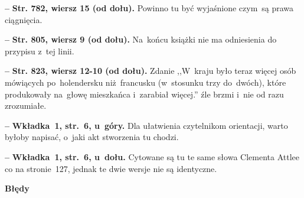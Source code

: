 \documentclass[a4paper,11pt]{article}
\newcommand{\spaceFour}{0.5em}
\newcommand{\tb}{\textbf}
\newcommand{\noi}{\noindent}
\newcommand{\start}{\noi \tb{--} {}}
\newcommand{\Center}[1]{\begin{center} #1 \end{center}}
\newcommand{\CenterTB}[1]{\Center{\tb{#1}}}
\newcommand{\StrWd}[2]{\tb{Str. #1, wiersz #2 (od dołu).}}
\begin{document}
\vspace{\spaceFour}


\start \StrWd{782}{15} Powinno tu być wyjaśnione czym~są prawa
ciągnięcia.

\vspace{\spaceFour}


\start \StrWd{805}{9} Na~końcu książki nie ma odniesienia do przypisu
z~tej linii.

\vspace{\spaceFour}


\start \StrWd{823}{12-10} Zdanie ,,W~kraju było teraz więcej osób
mówiących po~holendersku niż~francusku (w~stosunku trzy do~dwóch),
które produkowały na~głowę mieszkańca i~zarabiał więcej.'' źle brzmi
i~nie od razu zrozumiałe.

\vspace{\spaceFour}


\start \tb{Wkładka~1, str.~6, u~góry.} Dla ułatwienia czytelnikom
orientacji, warto byłoby napisać, o~jaki akt stworzenia tu chodzi.

\vspace{\spaceFour}


\start \tb{Wkładka~1, str.~6, u~dołu.} Cytowane są tu te same słowa
Clementa Attlee co na stronie~127, jednak te dwie wersje nie są
identyczne.


\CenterTB{Błędy}

\nopagebreak
\end{document}

